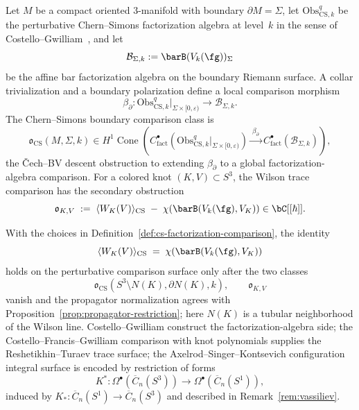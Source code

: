 \begin{definition}
\label{def:cs-factorization-comparison}
Let $M$ be a compact oriented $3$-manifold with boundary
$\partial M=\Sigma$, let $\mathrm{Obs}^{q}_{\mathrm{CS},k}$ be the
perturbative Chern--Simons factorization algebra at level~$k$ in the
sense of Costello--Gwilliam~\cite{CG17}, and let
\[
\mathcal B_{\Sigma,k}:=\barB(V_k(\fg))_\Sigma
\]
be the affine bar factorization algebra on the boundary Riemann
surface.  A collar trivialization and a boundary polarization define a
local comparison morphism
\[
\beta_{\partial}:
\mathrm{Obs}^{q}_{\mathrm{CS},k}\big|_{\Sigma\times[0,\varepsilon)}
\longrightarrow
\mathcal B_{\Sigma,k}.
\]
The Chern--Simons boundary comparison class is
\[
\mathfrak{o}_{\mathrm{CS}}(M,\Sigma,k)
\in
H^1\!\operatorname{Cone}\!\left(
C^\bullet_{\mathrm{fact}}\!
\left(\mathrm{Obs}^{q}_{\mathrm{CS},k}\big|_{\Sigma\times[0,\varepsilon)}\right)
\xrightarrow{\ \beta_\partial\ }
C^\bullet_{\mathrm{fact}}(\mathcal B_{\Sigma,k})
\right),
\]
the \v{C}ech--BV descent obstruction to extending
$\beta_\partial$ to a global factorization-algebra comparison.  For a
colored knot $(K,V)\subset S^3$, the Wilson trace comparison has the
secondary obstruction
\[
\mathfrak{o}_{K,V}
\;:=\;
\langle W_K(V)\rangle_{\mathrm{CS}}
\;-\;
\chi(\barB(V_k(\fg),V_K))
\in \bC[[\hbar]] .
\]
\end{definition}

\begin{proposition}
\label{prop:cs-comparison-criterion}
With the choices in Definition~\ref{def:cs-factorization-comparison}, the
identity
\[
\langle W_K(V)\rangle_{\mathrm{CS}}
\;=\;
\chi(\barB(V_k(\fg),V_K))
\]
holds on the perturbative comparison surface only after the two
classes
\[
\mathfrak{o}_{\mathrm{CS}}(S^3\setminus N(K),\partial N(K),k),
\qquad
\mathfrak{o}_{K,V}
\]
vanish and the propagator normalization agrees with
Proposition~\ref{prop:propagator-restriction}; here $N(K)$ is a
tubular neighborhood of the Wilson line.  Costello--Gwilliam
\cite{CG17} construct the factorization-algebra side; the
Costello--Francis--Gwilliam comparison with knot polynomials
\cite{CFG25} supplies the Reshetikhin--Turaev trace surface; the
Axelrod--Singer--Kontsevich configuration integral surface is
encoded by restriction of forms
\[
K^*:\Omega^\bullet(\overline{C}_n(S^3))
\longrightarrow
\Omega^\bullet(\overline{C}_n(S^1)),
\]
induced by $K_*:\overline{C}_n(S^1)\to\overline{C}_n(S^3)$ and
described in Remark~\ref{rem:vassiliev}.
\end{proposition}


